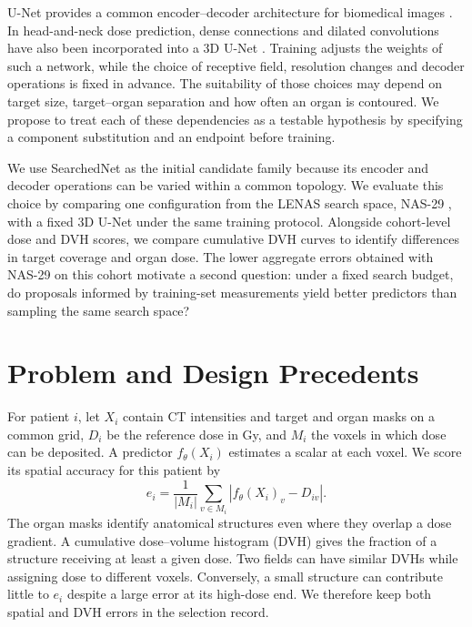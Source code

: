 \documentclass[letterpaper]{article}
\begin{document}
U-Net provides a common encoder--decoder architecture for biomedical images \citep{unet}. In head-and-neck dose prediction, dense connections and dilated convolutions have also been incorporated into a 3D U-Net \citep{gronberg}. Training adjusts the weights of such a network, while the choice of receptive field, resolution changes and decoder operations is fixed in advance. The suitability of those choices may depend on target size, target--organ separation and how often an organ is contoured. We propose to treat each of these dependencies as a testable hypothesis by specifying a component substitution and an endpoint before training.

We use SearchedNet as the initial candidate family because its encoder and decoder operations can be varied within a common topology. We evaluate this choice by comparing one configuration from the LENAS search space, NAS-29 \citep{lenas}, with a fixed 3D U-Net under the same training protocol. Alongside cohort-level dose and DVH scores, we compare cumulative DVH curves to identify differences in target coverage and organ dose. The lower aggregate errors obtained with NAS-29 on this cohort motivate a second question: under a fixed search budget, do proposals informed by training-set measurements yield better predictors than sampling the same search space?

\section{Problem and Design Precedents}
For patient $i$, let $X_i$ contain CT intensities and target and organ masks on a common grid, $D_i$ be the reference dose in Gy, and $M_i$ the voxels in which dose can be deposited. A predictor $f_\theta(X_i)$ estimates a scalar at each voxel. We score its spatial accuracy for this patient by
\begin{equation}
 e_i=\frac{1}{|M_i|}\sum_{v\in M_i}
 \left|f_\theta(X_i)_v-D_{iv}\right|.
\end{equation}
The organ masks identify anatomical structures even where they overlap a dose gradient. A cumulative dose--volume histogram (DVH) gives the fraction of a structure receiving at least a given dose. Two fields can have similar DVHs while assigning dose to different voxels. Conversely, a small structure can contribute little to $e_i$ despite a large error at its high-dose end. We therefore keep both spatial and DVH errors in the selection record.
\end{document}
